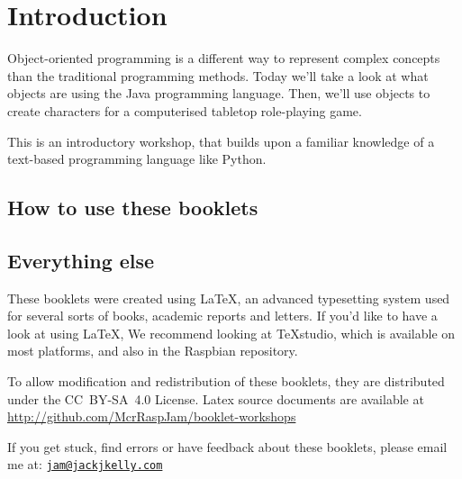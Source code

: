 \setcounter{section}{-1}
\section{Introduction}
	
	Object-oriented programming is a different way to represent complex concepts than the traditional programming methods.
	Today we'll take a look at what objects are using the Java programming language.	
	Then, we'll use objects to create characters for a computerised tabletop role-playing game.

	This is an introductory workshop, that builds upon a familiar knowledge of a text-based programming language like Python.
		
	\subsection*{How to use these booklets}

	
	
	
	
	
	
	
	\subsection*{Everything else}
	
		These booklets were created using \textrm{\LaTeX}, an advanced typesetting system used for several sorts of books, academic reports and letters.
		\ifprint\else
			If you'd like to have a look at using LaTeX, We recommend looking at \TeX studio, which is available on most platforms, and also in the Raspbian repository.
		\fi
		
		
		To allow modification and redistribution of these booklets, they are distributed under the \hbox{CC BY-SA 4.0} License.
		Latex source documents are available at \url{http://github.com/McrRaspJam/booklet-workshops}
		
		If you get stuck, find errors or have feedback about these booklets, please email me at:
		\href{mailto:jam@jackjkelly.com}{\texttt{jam@jackjkelly.com}}